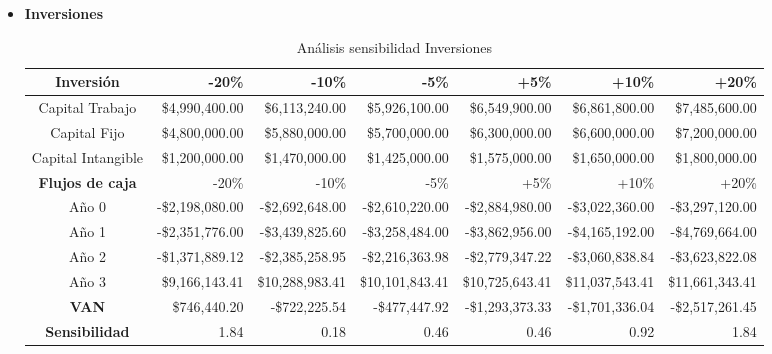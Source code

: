 \begin{enumerate}[(a)]
\begin{itemize}
              \item {\bf Inversiones}\\
                \begin{table}[h!t]
                    \centering
                    \scriptsize
                    \begin{tabular}{|c|r|r|r|r|r|r|}
                        \hline
                        {\bf Inversión}      & -20\%           & -10\%           & -5\%            & +5\%            & +10\%           & +20\% \\\hline
                        Capital Trabajo      & \$4,990,400.00  & \$6,113,240.00  & \$5,926,100.00  & \$6,549,900.00  & \$6,861,800.00  & \$7,485,600.00 \\\hline
                        Capital Fijo         & \$4,800,000.00  & \$5,880,000.00  & \$5,700,000.00  & \$6,300,000.00  & \$6,600,000.00  & \$7,200,000.00 \\\hline
                        Capital Intangible   & \$1,200,000.00  & \$1,470,000.00  & \$1,425,000.00  & \$1,575,000.00  & \$1,650,000.00  & \$1,800,000.00 \\\hline
                        \hline
                        {\bf Flujos de caja} & -20\%           & -10\%           & -5\%            & +5\%            & +10\%           & +20\% \\\hline
                        Año 0                & -\$2,198,080.00 & -\$2,692,648.00 & -\$2,610,220.00 & -\$2,884,980.00 & -\$3,022,360.00 & -\$3,297,120.00\\\hline
                        Año 1                & -\$2,351,776.00 & -\$3,439,825.60 & -\$3,258,484.00 & -\$3,862,956.00 & -\$4,165,192.00 & -\$4,769,664.00\\\hline
                        Año 2                & -\$1,371,889.12 & -\$2,385,258.95 & -\$2,216,363.98 & -\$2,779,347.22 & -\$3,060,838.84 & -\$3,623,822.08\\\hline
                        Año 3                & \$9,166,143.41  & \$10,288,983.41 & \$10,101,843.41 & \$10,725,643.41 & \$11,037,543.41 & \$11,661,343.41\\\hline
                        \hline
                        {\bf VAN }           & \$746,440.20    & -\$722,225.54   & -\$477,447.92   & -\$1,293,373.33 & -\$1,701,336.04 & -\$2,517,261.45 \\\hline
                        {\bf Sensibilidad}   & 1.84            & 0.18            & 0.46            & 0.46            & 0.92            & 1.84 \\\hline
                    \end{tabular}
                    \caption{Análisis sensibilidad Inversiones}
                \end{table}


\end{itemize}
\end{enumerate}
